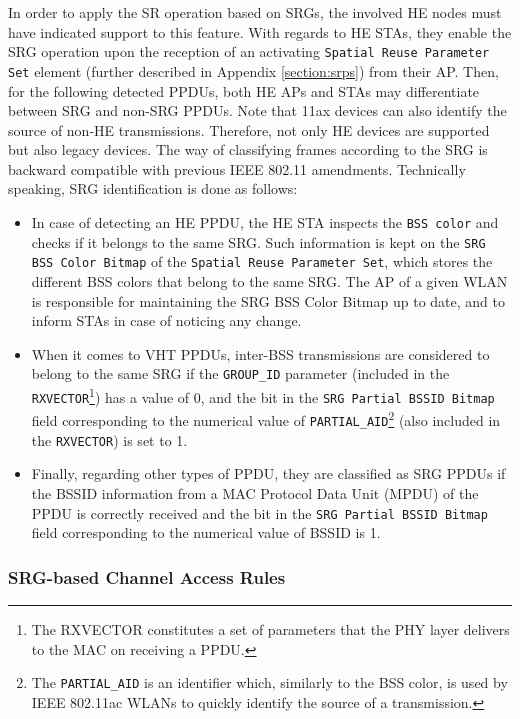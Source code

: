 \documentclass[preprint,12pt]{elsarticle}
\begin{document}
	In order to apply the SR operation based on SRGs, the involved HE nodes must have indicated support to this feature. With regards to HE STAs, they enable the SRG operation upon the reception of an activating \texttt{Spatial Reuse Parameter Set} element (further described in Appendix \ref{section:srps}) from their AP. Then, for the following detected PPDUs, both HE APs and STAs may differentiate between SRG and non-SRG PPDUs. Note that 11ax devices can also identify the source of non-HE transmissions. Therefore, not only HE devices are supported but also legacy devices. The way of classifying frames according to the SRG is backward compatible with previous IEEE 802.11 amendments. Technically speaking, SRG identification is done as follows:
	\begin{itemize}
		\item In case of detecting an HE PPDU, the HE STA inspects the \texttt{BSS color} and checks if it belongs to the same SRG. Such information is kept on the \texttt{SRG BSS Color Bitmap} of the \texttt{Spatial Reuse Parameter Set}, which stores the different BSS colors that belong to the same SRG. The AP of a given WLAN is responsible for maintaining the SRG BSS Color Bitmap up to date, and to inform STAs in case of noticing any change.
		\item When it comes to VHT PPDUs, inter-BSS transmissions are considered to belong to the same SRG if the \texttt{GROUP\_ID} parameter (included in the \texttt{RXVECTOR}\footnote{The RXVECTOR constitutes a set of parameters that the PHY layer delivers to the MAC on receiving a PPDU.}) has a value of 0, and the bit in the \texttt{SRG Partial BSSID Bitmap} field corresponding to the numerical value of \texttt{PARTIAL\_AID}\footnote{The \texttt{PARTIAL\_AID} is an identifier which, similarly to the BSS color, is used by IEEE 802.11ac WLANs to quickly identify the source of a transmission.} (also included in the \texttt{RXVECTOR}) is set to 1. 
		\item Finally, regarding other types of PPDU, they are classified as SRG PPDUs if the BSSID information from a MAC Protocol Data Unit (MPDU) of the PPDU is correctly received and the bit in the \texttt{SRG Partial BSSID Bitmap} field corresponding to the numerical value of BSSID is 1.
	\end{itemize}
	
	\subsubsection{SRG-based Channel Access Rules}
	\label{section:srg_channel_access}
	
\end{document}
